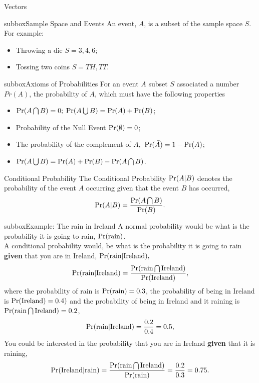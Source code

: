 \documentclass[10pt,a4paper]{article}
\def\Pr{\mathop{\rm Pr}}
\begin{document}
\begin{multicols}{3}
\begin{textbox}{Vectors }
\begin{subbox}{subbox}{Sample Space and Events}
An event, $A$, is a subset of the sample space $S$. For example:
\begin{itemize}
    \item Throwing a die $S={3,4,6};$
    \item Tossing two coins $S={TH,TT}.$
\end{itemize}
\end{subbox}

\begin{subbox}{subbox}{Axioms of Probabilities}
\tiny
For an event $A$ subset $S$ associated a number $Pr(A)$, the probability of $A$, which must have the following properties

\begin{itemize}
     \item $\Pr(A \bigcap B)=0;$ $\Pr(A\bigcup B)= \Pr(A)+\Pr(B) $;
     \item Probability of the Null Event $\Pr(\emptyset)=0$;
     \item The probability of the complement of $A,$ $\Pr(\bar{A})=1-\Pr(A)$;
     \item $\Pr(A \bigcup B)= \Pr(A)+\Pr(B)-\Pr(A\bigcap B)$.
\end{itemize}
\end{subbox}


\end{textbox}


\begin{textbox}{Conditional Probability}
 The Conditional Probability $\Pr(A|B)$ denotes the probability of the event $A$ occurring given that the event $B$ has occurred,
\[ \Pr(A|B)=\frac{\Pr(A\bigcap B)}{\Pr(B)}.\]
\begin{subbox}{subbox}{Example: The rain in Ireland}
\tiny
A normal probability would be what is the probability it is going to rain, $\Pr(\text{rain})$.\\
A conditional probability would, be what is the probability it is going to rain \textbf{given} that you are in Ireland, $\Pr(\text{rain}|\text{Ireland}),$
\[ \Pr(\text{rain}|\text{Ireland})=\frac{\Pr(\text{rain}\bigcap \text{Ireland})}{\Pr(\text{Ireland})},\]
where the probability of rain is $\Pr(\text{rain})=0.3$, the probability of being in Ireland is $\Pr(\text{Ireland})=0.4)$ and the probability of being in Ireland and it raining is $\Pr(\text{rain}\bigcap \text{Ireland})=0.2$,
\[ \Pr(\text{rain}|\text{Ireland})=\frac{0.2}{0.4}=0.5,\]
You could be interested in the probability that you are in Ireland \textbf{given} that it is raining, 
\[ \Pr(\text{Ireland}|\text{rain})=\frac{\Pr(\text{rain}\bigcap \text{Ireland})}{\Pr(\text{rain})}=\frac{0.2}{0.3}=0.75.\]
\end{subbox}
\end{textbox}


\end{multicols}
\end{document}
